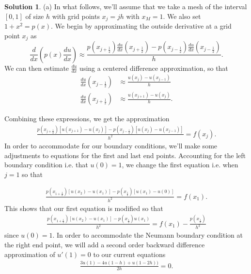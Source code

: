 \documentclass[12pt]{article}
\theoremstyle{definition}
\newtheorem{sol}{Solution}
\theoremstyle{remark}
\begin{document}
\begin{sol}
    (a) In what follows, we'll assume that we take a mesh of the interval $[0,1]$ of size $h$ with grid points $x_{j} = j h $ with $x_{M} = 1$. We also set $ 1 + x^{2} = p(x)$. We begin by approximating the outside derivative at a grid point $x_{j}$ as 
    \begin{equation*}
        \frac{d}{dx} \left(p(x) \frac{du}{dx} \right) \approx \frac{p(x_{j+ \frac{1}{2}})  \frac{du}{dx}(x_{j + \frac{1}{2}}) - p(x_{j - \frac{1}{2}})  \frac{du}{dx}(x_{j - \frac{1}{2}}) }{h}.
    \end{equation*}
    We can then estimate $\frac{du}{dx}$ using a centered difference approximation, so that
    \begin{align*}
        \frac{du}{dx}(x_{j - \frac{1}{2}}) &\approx \frac{u(x_{j}) - u(x_{j-1})}{h}\\
        \frac{du}{dx}(x_{j + \frac{1}{2}}) &\approx \frac{u(x_{j+1}) - u(x_{j})}{h}.
    \end{align*}

    Combining these expressions, we get the approximation
    \begin{align*}
        \frac{ p(x_{j + \frac{1}{2}}) [u(x_{j+1}) - u(x_{j})] - p(x_{j - \frac{1}{2}})[u(x_{j}) - u(x_{j-1})] }{h^{2}} = f(x_{j}).
    \end{align*}
    In order to accommodate for our boundary conditions, we'll make some adjustments to equations for the first and last end points. Accounting for the left boundary condition i.e. that $u(0) = 1$, we change the first equation i.e. when $j = 1$ so that

    \begin{align*}
      \frac{ p(x_{1 + \frac{1}{2}}) [u(x_{2}) - u(x_{1})] - p(x_{\frac{1}{2}})[u(x_{1}) - u(0)] }{h^{2}} = f(x_{1}).
    \end{align*}
    This shows that our first equation is modified so that
    \begin{align*}
        \frac{ p(x_{1 + \frac{1}{2}}) [u(x_{2}) - u(x_{1})] - p(x_{\frac{1}{2}})u(x_{1}) }{h^{2}} = f(x_{1}) - \frac{p(x_{\frac{1}{2}})}{h^{2}}
    \end{align*}
    since $u(0) = 1$. In order to accommodate the Neumann boundary condition at the right end point, we will add a second order backward difference approximation of $u'(1) = 0$ to our current equations
    \begin{align*}
        \frac{3 u(1) - 4 u(1-h) + u(1 - 2h) )}{2h} = 0.
    \end{align*}


\end{sol}
\end{document}
